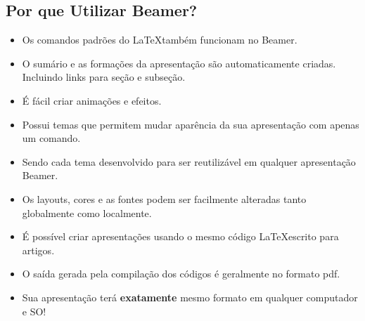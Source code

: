\subsection{Por que Utilizar Beamer?}

\begin{frame}
  \begin{itemize}[<+->]
     \item Os comandos padrões do \LaTeX também funcionam no Beamer.
     \item O sumário e as formações da apresentação são automaticamente criadas. Incluindo
          links para seção e subseção.
     \item É fácil criar animações e efeitos.
     \item Possui temas que permitem mudar aparência da sua apresentação com apenas um comando.
     \item Sendo cada tema desenvolvido para ser reutilizável em qualquer apresentação Beamer.
  \end{itemize}

\end{frame}


\begin{frame}
   \begin{itemize}[<+->]
      \item Os layouts, cores e as fontes podem ser facilmente alteradas tanto globalmente como
            localmente.
      \item É possível criar apresentações usando o mesmo código \LaTeX escrito para artigos.
      \item O saída gerada pela compilação dos códigos é geralmente no formato pdf.
      \item \alert{Sua apresentação terá \textbf{exatamente} mesmo formato em qualquer computador e SO!}
   \end{itemize}
\end{frame}


